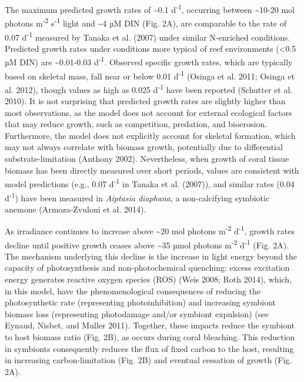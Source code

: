 \documentclass[]{elsarticle} %
\begin{document}
The maximum predicted growth rates of \textasciitilde{}0.1
d\textsuperscript{-1}, occurring between \textasciitilde{}10-20 mol
photons m\textsuperscript{-2} s\textsuperscript{-1} light and
\textasciitilde{}4 µM DIN (Fig. 2A), are comparable to the rate of 0.07
d\textsuperscript{-1} measured by Tanaka et al. (2007) under similar
N-enriched conditions. Predicted growth rates under conditions more
typical of reef environments (\textless{}0.5 µM DIN) are
\textasciitilde{}0.01-0.03 d\textsuperscript{-1}. Observed specific
growth rates, which are typically based on skeletal mass, fall near or
below 0.01 d\textsuperscript{-1} (Osinga et al. 2011; Osinga et al.
2012), though values as high as 0.025 d\textsuperscript{-1} have been
reported (Schutter et al. 2010). It is not surprising that predicted
growth rates are slightly higher than most observations, as the model
does not account for external ecological factors that may reduce growth,
such as competition, predation, and bioerosion. Furthermore, the model
does not explicitly account for skeletal formation, which may not always
correlate with biomass growth, potentially due to differential
substrate-limitation (Anthony 2002). Nevertheless, when growth of coral
tissue biomass has been directly measured over short periods, values are
consistent with model predictions (e.g., 0.07 d\textsuperscript{-1} in
Tanaka et al. (2007)), and similar rates (0.04 d\textsuperscript{-1})
have been measured in \emph{Aiptasia diaphana}, a non-calcifying
symbiotic anemone (Armoza-Zvuloni et al. 2014).

As irradiance continues to increase above \textasciitilde{}20 mol
photons m\textsuperscript{-2} d\textsuperscript{-1}, growth rates
decline until positive growth ceases above \textasciitilde{}35 µmol
photons m\textsuperscript{-2} d\textsuperscript{-1} (Fig. 2A). The
mechanism underlying this decline is the increase in light energy beyond
the capacity of photosynthesis and non-photochemical quenching: excess
excitation energy generates reactive oxygen species (ROS) (Weis 2008;
Roth 2014), which, in this model, have the phenomenological consequences
of reducing the photosynthetic rate (representing photoinhibition) and
increasing symbiont biomass loss (representing photodamage and/or
symbiont expulsion) (see Eynaud, Nisbet, and Muller 2011). Together,
these impacts reduce the symbiont to host biomass ratio (Fig. 2B), as
occurs during coral bleaching. This reduction in symbionts consequently
reduces the flux of fixed carbon to the host, resulting in increasing
carbon-limitation (Fig. 2B) and eventual cessation of growth (Fig. 2A).
\end{document}
